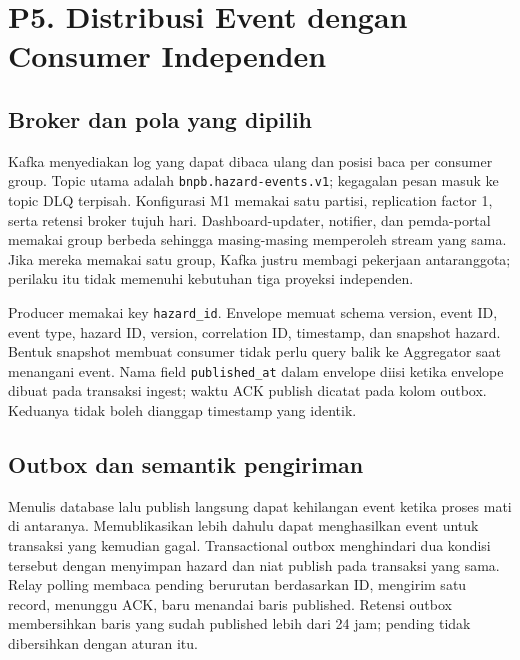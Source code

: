 \section{P5. Distribusi Event dengan Consumer Independen}
\label{sec:p5}
\subsection{Broker dan pola yang dipilih}
Kafka menyediakan log yang dapat dibaca ulang dan posisi baca per consumer group. Topic utama adalah \texttt{bnpb.hazard-events.v1}; kegagalan pesan masuk ke topic DLQ terpisah. Konfigurasi M1 memakai satu partisi, replication factor 1, serta retensi broker tujuh hari. Dashboard-updater, notifier, dan pemda-portal memakai group berbeda sehingga masing-masing memperoleh stream yang sama. Jika mereka memakai satu group, Kafka justru membagi pekerjaan antaranggota; perilaku itu tidak memenuhi kebutuhan tiga proyeksi independen.

Producer memakai key \texttt{hazard\_id}. Envelope memuat schema version, event ID, event type, hazard ID, version, correlation ID, timestamp, dan snapshot hazard. Bentuk snapshot membuat consumer tidak perlu query balik ke Aggregator saat menangani event. Nama field \texttt{published\_at} dalam envelope diisi ketika envelope dibuat pada transaksi ingest; waktu ACK publish dicatat pada kolom outbox. Keduanya tidak boleh dianggap timestamp yang identik.

\subsection{Outbox dan semantik pengiriman}

Menulis database lalu publish langsung dapat kehilangan event ketika proses mati di antaranya. Memublikasikan lebih dahulu dapat menghasilkan event untuk transaksi yang kemudian gagal. Transactional outbox menghindari dua kondisi tersebut dengan menyimpan hazard dan niat publish pada transaksi yang sama. Relay polling membaca pending berurutan berdasarkan ID, mengirim satu record, menunggu ACK, baru menandai baris published. Retensi outbox membersihkan baris yang sudah published lebih dari 24 jam; pending tidak dibersihkan dengan aturan itu.

